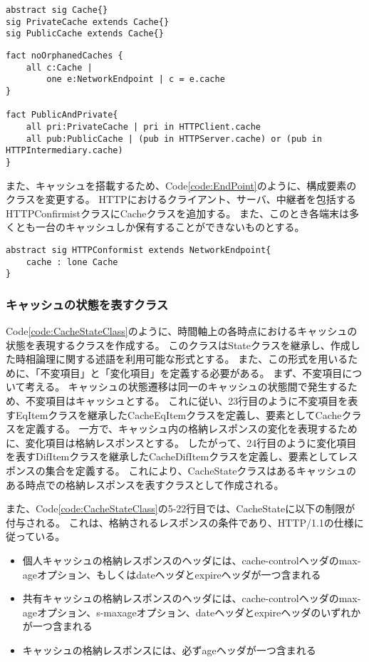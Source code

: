 \documentclass[journal]{IEEEtran}
\begin{document}
\begin{lstlisting}[caption=Cacheクラス, label=code:CacheClass]
abstract sig Cache{}
sig PrivateCache extends Cache{}
sig PublicCache extends Cache{}
\end{lstlisting}

\begin{lstlisting}[caption=Cacheクラスの制限, label=code:LimitedCacheClass]
fact noOrphanedCaches {
	all c:Cache |
		one e:NetworkEndpoint | c = e.cache
}

fact PublicAndPrivate{
	all pri:PrivateCache | pri in HTTPClient.cache
	all pub:PublicCache | (pub in HTTPServer.cache) or (pub in HTTPIntermediary.cache)
}
\end{lstlisting}

また、キャッシュを搭載するため、Code\ref{code:EndPoint}のように、構成要素のクラスを変更する。
HTTPにおけるクライアント、サーバ、中継者を包括するHTTPConfirmistクラスにCacheクラスを追加する。
また、このとき各端末は多くとも一台のキャッシュしか保有することができないものとする。
\begin{lstlisting}[caption=HTTPを利用するウェブの構成要素, label=code:EndPoint]
abstract sig HTTPConformist extends NetworkEndpoint{
	cache : lone Cache
}
\end{lstlisting}

\subsubsection{キャッシュの状態を表すクラス}
\label{sec:CacheClass}
Code\ref{code:CacheStateClass}のように、時間軸上の各時点におけるキャッシュの状態を表現するクラスを作成する。
このクラスはStateクラスを継承し、作成した時相論理に関する述語を利用可能な形式とする。
また、この形式を用いるために、「不変項目」と「変化項目」を定義する必要がある。
まず、不変項目について考える。
キャッシュの状態遷移は同一のキャッシュの状態間で発生するため、不変項目はキャッシュとする。
これに従い、23行目のように不変項目を表すEqItemクラスを継承したCacheEqItemクラスを定義し、要素としてCacheクラスを定義する。
一方で、キャッシュ内の格納レスポンスの変化を表現するために、変化項目は格納レスポンスとする。
したがって、24行目のように変化項目を表すDifItemクラスを継承したCacheDifItemクラスを定義し、要素としてレスポンスの集合を定義する。
これにより、CacheStateクラスはあるキャッシュのある時点での格納レスポンスを表すクラスとして作成される。

また、Code\ref{code:CacheStateClass}の5-22行目では、CacheStateに以下の制限が付与される。
これは、格納されるレスポンスの条件であり、HTTP/1.1の仕様に従っている。
\begin{itemize}
\item 個人キャッシュの格納レスポンスのヘッダには、cache-controlヘッダのmax-ageオプション、もしくはdateヘッダとexpireヘッダが一つ含まれる
\item 共有キャッシュの格納レスポンスのヘッダには、cache-controlヘッダのmax-ageオプション、s-maxageオプション、dateヘッダとexpireヘッダのいずれかが一つ含まれる
\item キャッシュの格納レスポンスには、必ずageヘッダが一つ含まれる
\end{itemize}
\end{document}
